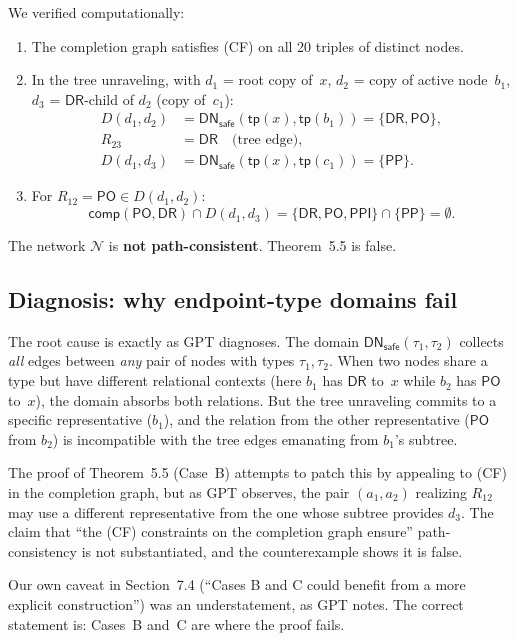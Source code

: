 \documentclass[a4paper,11pt]{article}
\theoremstyle{definition}
\newcommand{\DR}{\ensuremath{\mathsf{DR}}}
\newcommand{\PO}{\ensuremath{\mathsf{PO}}}
\newcommand{\PP}{\ensuremath{\mathsf{PP}}}
\newcommand{\PPI}{\ensuremath{\mathsf{PPI}}}
\newcommand{\comp}{\ensuremath{\mathsf{comp}}}
\newcommand{\DNsafe}{\ensuremath{\mathsf{DN}_{\mathsf{safe}}}}
\begin{document}
We verified computationally:
\begin{enumerate}[nosep]
  \item The completion graph satisfies (CF) on all 20 triples of
    distinct nodes.
  \item In the tree unraveling, with $d_1$ = root copy of~$x$, $d_2$
    = copy of active node~$b_1$, $d_3$ = $\DR$-child of $d_2$
    (copy of~$c_1$):
    \begin{align*}
      D(d_1, d_2) &= \DNsafe(\mathsf{tp}(x), \mathsf{tp}(b_1))
        = \{\DR, \PO\}, \\
      R_{23} &= \DR \quad\text{(tree edge)}, \\
      D(d_1, d_3) &= \DNsafe(\mathsf{tp}(x), \mathsf{tp}(c_1))
        = \{\PP\}.
    \end{align*}
  \item For $R_{12} = \PO \in D(d_1, d_2)$:
    \[
      \comp(\PO, \DR) \cap D(d_1, d_3) = \{\DR, \PO, \PPI\} \cap
      \{\PP\} = \emptyset.
    \]
\end{enumerate}

The network $\mathcal{N}$ is \textbf{not path-consistent}.
Theorem~5.5 is false.

\subsection{Diagnosis: why endpoint-type domains fail}

The root cause is exactly as GPT diagnoses.  The domain
$\DNsafe(\tau_1, \tau_2)$ collects \emph{all} edges between
\emph{any} pair of nodes with types $\tau_1, \tau_2$.  When two nodes
share a type but have different relational contexts (here $b_1$ has
$\DR$ to~$x$ while $b_2$ has $\PO$ to~$x$), the domain absorbs both
relations.  But the tree unraveling commits to a specific
representative ($b_1$), and the relation from the other representative
($\PO$ from $b_2$) is incompatible with the tree edges emanating from
$b_1$'s subtree.

The proof of Theorem~5.5 (Case~B) attempts to patch this by appealing
to (CF) in the completion graph, but as GPT observes, the pair
$(a_1, a_2)$ realizing $R_{12}$ may use a different representative
from the one whose subtree provides $d_3$.  The claim that ``the
(CF) constraints on the completion graph ensure'' path-consistency is
not substantiated, and the counterexample shows it is false.

Our own caveat in Section~7.4 (``Cases B and C could benefit from a
more explicit construction'') was an understatement, as GPT notes.
The correct statement is: Cases~B and~C are where the proof fails.
\end{document}
